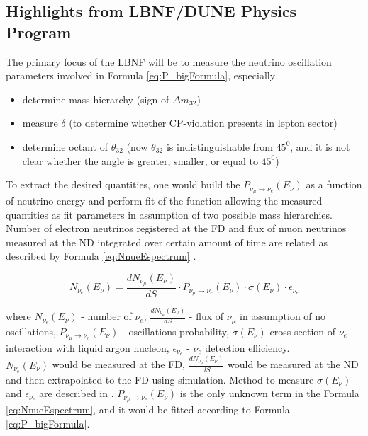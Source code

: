 \subsection{Highlights from LBNF/DUNE Physics Program}

The primary focus of the LBNF will be to measure the neutrino oscillation parameters involved in Formula \ref{eq:P_bigFormula}, especially 
\begin{itemize}
\item determine mass hierarchy (sign of $\Delta{m_{32}}$)
\item measure $\delta$ (to determine whether CP-violation presents in lepton sector)
\item determine octant of $\theta_{32}$ (now $\theta_{32}$ is indistinguishable from $45^0$, and it is not clear whether the angle is greater, smaller, or equal to $45^0$)
\end{itemize}

To extract the desired quantities, one would build the $P_{\nu_\mu \rightarrow \nu_e}(E_{\nu})$ as a function of neutrino energy and perform fit of the function allowing the measured quantities as fit parameters in assumption of two possible mass hierarchies. Number of electron neutrinos registered at the FD and flux of muon neutrinos measured at the ND integrated over certain amount of time are related as described by Formula \ref{eq:NnueEspectrum} \cite{ref_LisaWhitehead}. \\

\begin{center}
\begin{equation}
\label{eq:NnueEspectrum}
N_{\nu_e}(E_{\nu}) = \frac{dN_{\nu_\mu}(E_{\nu})}{dS} \cdot P_{\nu_\mu \rightarrow \nu_e}(E_{\nu}) \cdot \sigma(E_{\nu}) \cdot \epsilon_{\nu_e} 
\end{equation}
\end{center}
where $N_{\nu_e}(E_{\nu})$ - number of $\nu_e$, $\frac{dN_{\nu_\mu}(E_{\nu})}{dS}$ - flux of $\nu_\mu$ in assumption of no oscillations, $P_{\nu_\mu \rightarrow \nu_e}(E_{\nu})$ - oscillations probability, $\sigma(E_{\nu})$ cross section of $\nu_e$ interaction with liquid argon nucleon, $\epsilon_{\nu_e}$ - $\nu_e$ detection efficiency.\\

$N_{\nu_e}(E_{\nu})$ would be measured at the FD, $\frac{dN_{\nu_\mu}(E_{\nu})}{dS}$ would be measured at the ND and then extrapolated to the FD using simulation. Method to measure $\sigma(E_{\nu})$ and $\epsilon_{\nu_e}$ are described in \cite{ref_eff_ICARUS}. $P_{\nu_\mu \rightarrow \nu_e}(E_{\nu})$ is the only unknown term in the Formula \ref{eq:NnueEspectrum}, and it would be fitted according to Formula \ref{eq:P_bigFormula}.

